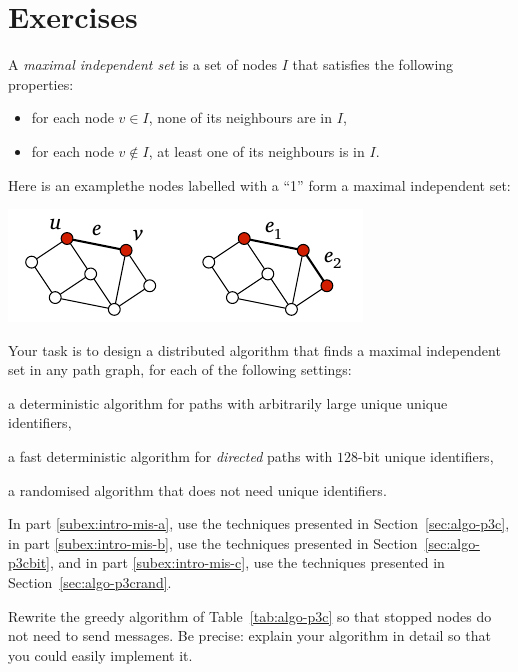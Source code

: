 \section{Exercises}

\begin{ex}\label{ex:intro-mis}
    A \emph{maximal independent set} is a set of nodes $I$ that satisfies the following properties:
    \begin{itemize}[noitemsep]
        \item for each node $v \in I$, none of its neighbours are in $I$,
        \item for each node $v \notin I$, at least one of its neighbours is in $I$.
    \end{itemize}
    Here is an example\mydash the nodes labelled with a ``1'' form a maximal independent set:
    \begin{center}
        \includegraphics[page=\PIntroMis]{figs.pdf}
    \end{center}
    Your task is to design a distributed algorithm that finds a maximal independent set in any path graph, for each of the following settings:
    \begin{subex}
        \item\label{subex:intro-mis-a} a deterministic algorithm for paths with arbitrarily large unique unique identifiers,
        \item\label{subex:intro-mis-b} a fast deterministic algorithm for \emph{directed} paths with $128$-bit unique identifiers,
        \item\label{subex:intro-mis-c} a randomised algorithm that does not need unique identifiers. 
    \end{subex}
    In part \ref{subex:intro-mis-a}, use the techniques presented in Section~\ref{sec:algo-p3c},
    in part \ref{subex:intro-mis-b}, use the techniques presented in Section~\ref{sec:algo-p3cbit}, and
    in part \ref{subex:intro-mis-c}, use the techniques presented in Section~\ref{sec:algo-p3crand}.
\end{ex}

\begin{ex}\label{ex:intro-stopped}
    Rewrite the greedy algorithm of Table~\ref{tab:algo-p3c} so that stopped nodes do not need to send messages. Be precise: explain your algorithm in detail so that you could easily implement it.
\end{ex}

